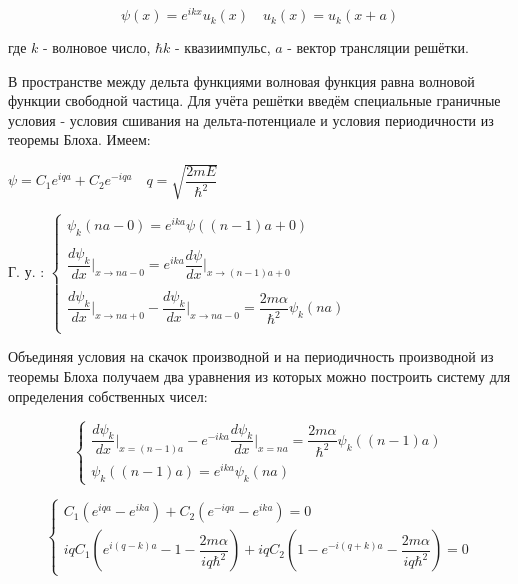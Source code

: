 \documentclass[a4paper, 12pt]{article}
\begin{document}
	\begin{equation}
		\psi(x) = e^{ikx} u_k(x) \quad u_k (x) = u_k (x+a)
	\end{equation}
	
	\quad где $k$ - волновое число, $\hbar k$ - квазиимпульс, $a$ - вектор трансляции решётки. 
	
	\quad В пространстве между дельта функциями волновая функция равна волновой функции свободной частица. Для учёта решётки введём специальные граничные условия - условия сшивания на дельта-потенциале и условия периодичности из теоремы Блоха. Имеем:
	
	\begin{center}
		$\psi = C_1 e^{iqa} + C_2 e^{-iqa} \quad q = \sqrt{\dfrac{2mE}{\hbar^2}}$ 
		
		Г. у. : $\begin{cases}
			\psi_k (na-0) = e^{ika} \psi((n-1)a+0) \\
			\\
			\dfrac{d\psi_k}{dx} \bigg|_{x\to na-0} = e^{ika}\dfrac{d\psi}{dx}\bigg|_{x\to (n-1)a+0} \\
			\\
			\dfrac{d\psi_k }{dx} \bigg|_{x\to na+0} - \dfrac{d\psi_k}{dx}\bigg|_{x \to na-0} = \dfrac{2m\alpha}{\hbar^2} \psi_k (na) \\ 
		\end{cases}$
		
	\end{center}
	
	\quad Объединяя условия на скачок производной и на периодичность производной из теоремы Блоха получаем два уравнения из которых можно построить систему для определения собственных чисел: 
	
	\begin{equation}
		\begin{cases}
			\dfrac{d\psi_k}{dx} \bigg|_{x=(n-1)a} - e^{-ika} \dfrac{d\psi_k}{dx}\bigg|_{x=na} = \dfrac{2m\alpha}{\hbar^2} \psi_k((n-1)a) \\
			\psi_k ((n-1)a) = e^{ika} \psi_k(na)  
		\end{cases}
	\end{equation}
	
	\begin{equation}
		\begin{cases}
			C_1 (e^{iqa} - e^{ika}) + C_2 (e^{-iqa} - e^{ika} ) = 0 \\
			iq C_1 \left(e^{i(q-k)a} - 1 - \dfrac{2m\alpha}{iq\hbar^2}\right) + iqC_2 \left(1-e^{-i(q+k)a} - \dfrac{2m\alpha}{iq\hbar^2}\right) = 0
		\end{cases}
	\end{equation}
	
\end{document}
